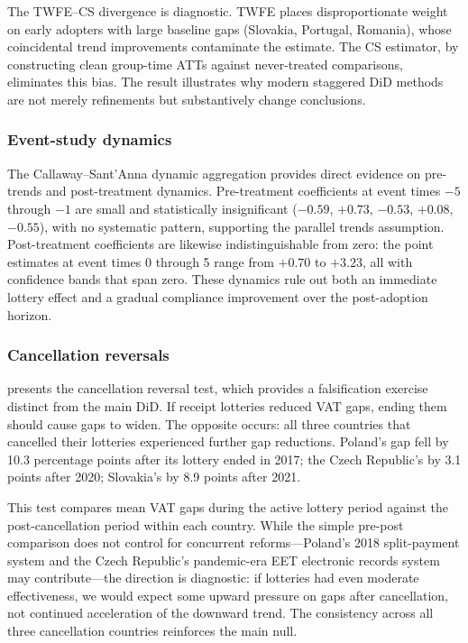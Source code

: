 \documentclass[12pt]{article}
\begin{document}
The TWFE--CS divergence is diagnostic. TWFE places disproportionate weight on early adopters with large baseline gaps (Slovakia, Portugal, Romania), whose coincidental trend improvements contaminate the estimate. The CS estimator, by constructing clean group-time ATTs against never-treated comparisons, eliminates this bias. The result illustrates why modern staggered DiD methods are not merely refinements but substantively change conclusions.

\subsubsection*{Event-study dynamics} The Callaway--Sant'Anna dynamic aggregation provides direct evidence on pre-trends and post-treatment dynamics. Pre-treatment coefficients at event times $-5$ through $-1$ are small and statistically insignificant ($-0.59$, $+0.73$, $-0.53$, $+0.08$, $-0.55$), with no systematic pattern, supporting the parallel trends assumption. Post-treatment coefficients are likewise indistinguishable from zero: the point estimates at event times 0 through 5 range from $+0.70$ to $+3.23$, all with confidence bands that span zero. These dynamics rule out both an immediate lottery effect and a gradual compliance improvement over the post-adoption horizon.

\subsubsection*{Cancellation reversals}  presents the cancellation reversal test, which provides a falsification exercise distinct from the main DiD. If receipt lotteries reduced VAT gaps, ending them should cause gaps to widen. The opposite occurs: all three countries that cancelled their lotteries experienced further gap reductions. Poland's gap fell by 10.3 percentage points after its lottery ended in 2017; the Czech Republic's by 3.1 points after 2020; Slovakia's by 8.9 points after 2021.

This test compares mean VAT gaps during the active lottery period against the post-cancellation period within each country. While the simple pre-post comparison does not control for concurrent reforms---Poland's 2018 split-payment system and the Czech Republic's pandemic-era EET electronic records system may contribute---the direction is diagnostic: if lotteries had even moderate effectiveness, we would expect some upward pressure on gaps after cancellation, not continued acceleration of the downward trend. The consistency across all three cancellation countries reinforces the main null.
\end{document}
